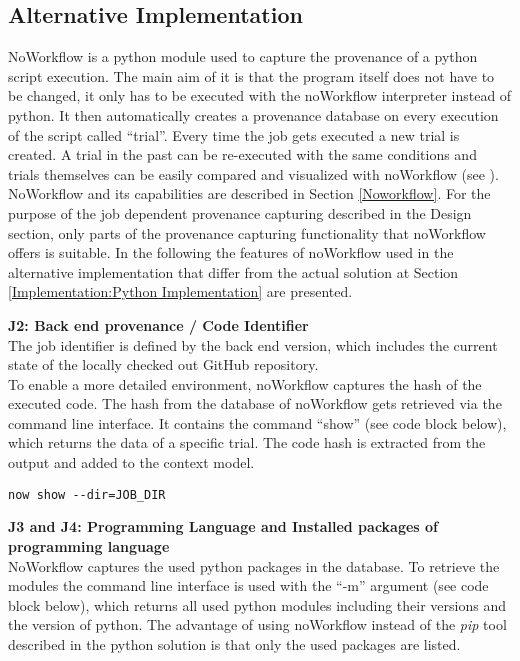 \documentclass[draft,final]{vutinfth} %
\begin{document}
\subsection{Alternative Implementation}\label{Implementation:Noworkflow Implementation}
NoWorkflow is a python module used to capture the provenance of a python script execution. The main aim of it is that the program itself does not have to be changed, it only has to be executed with the noWorkflow interpreter instead of python. It then automatically creates a provenance database on every execution of the script called “trial”. Every time the job gets executed a new trial is created. A trial in the past can be re-executed with the same conditions and trials themselves can be easily compared and visualized with noWorkflow (see \cite{c9e0604becba42af96a9cb0a6f60018b}). NoWorkflow and its capabilities are described in Section \ref{Noworkflow}. 
For the purpose of the job dependent provenance capturing described in the Design section, only parts of the provenance capturing functionality that noWorkflow offers is suitable. In the following the features of noWorkflow used in the alternative implementation that differ from the actual solution at Section \ref{Implementation:Python Implementation} are presented.    


\textbf{J2: Back end provenance / Code Identifier} \\
The job identifier is defined by the back end version, which includes the current state of the locally checked out GitHub repository.\\
To enable a more detailed environment, noWorkflow captures the hash of the executed code. The hash from the database of noWorkflow gets retrieved via the command line interface. It contains the command “show” (see code block below), which returns the data of a specific trial. The code hash is extracted from the output and added to the context model. 

\begin{lstlisting}[frame=single]
now show --dir=JOB_DIR
\end{lstlisting}

\textbf{J3 and J4: Programming Language and  Installed packages of programming language} \\
NoWorkflow captures the used python packages in the database. To retrieve the modules the command line interface is used with the “-m” argument (see code block below), which returns all used python modules including their versions and the version of python. The advantage of using noWorkflow instead of the \textit{pip} tool described in the python solution is that only the used packages are listed.
\end{document}
